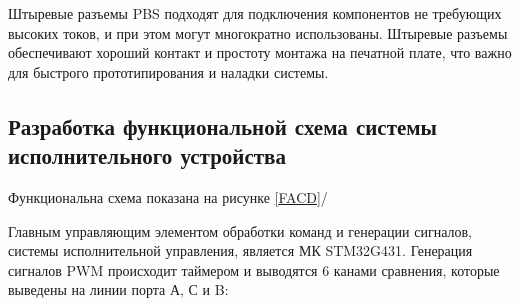 Штыревые разъемы PBS подходят для подключения компонентов не требующих высоких токов, и при этом могут многократно использованы. Штыревые разъемы обеспечивают хороший контакт и простоту монтажа на печатной плате, что важно для быстрого прототипирования и наладки системы.	


\begin{figure}[H]
  \end{figure}

\subsection{Разработка функциональной схема системы исполнительного устройства}
Функциональна схема показана на рисунке \ref{FACD}/ 

Главным управляющим элементом обработки команд и генерации сигналов, системы исполнительной управления, является МК STM32G431. Генерация сигналов PWM происходит таймером и выводятся 6 канами сравнения, которые выведены на линии порта А, С и B:

